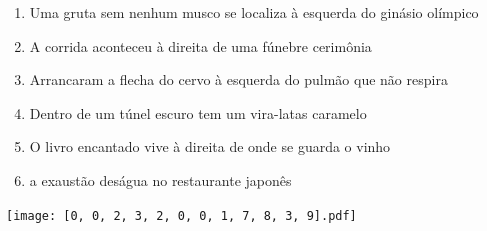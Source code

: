 \documentclass[12pt]{article}
\begin{document}
		 

\pagebreak


	\begin{enumerate}
		  \sffamily %
		  \large %


\vfill \item
Uma gruta sem nenhum musco se localiza	%
à esquerda
do ginásio olímpico	%

\vfill \item
A corrida aconteceu	%
à direita
de uma fúnebre cerimônia	%

\vfill \item
Arrancaram a flecha do cervo	%
à esquerda
do pulmão que não respira	%

\vfill \item
Dentro de um túnel escuro	%
tem um vira-latas caramelo	%

\vfill \item
O livro encantado vive	%
à direita
de onde se guarda o vinho	%

\vfill \item
a exaustão deságua	%
no restaurante japonês	%
	\end{enumerate}
		  
		  \hfill

		  \vfill

\texttt{[image: [0, 0, 2, 3, 2, 0, 0, 1, 7, 8, 3, 9].pdf]}


	\hfill	  	  


\pagebreak			
\end{document}
